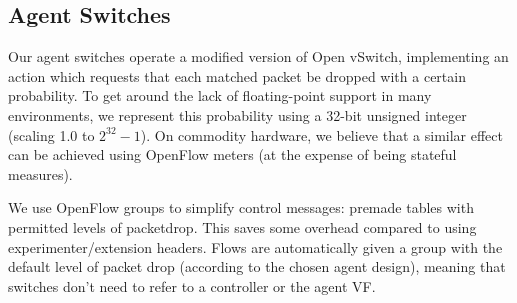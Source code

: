 \documentclass[10pt, times, conference, letterpaper]{IEEEtran}
\begin{document}
\subsection{Agent Switches}
Our agent switches operate a modified version of Open vSwitch, implementing an action which requests that each matched packet be dropped with a certain probability.
To get around the lack of floating-point support in many environments, we represent this probability using a 32-bit unsigned integer (scaling \num{1.0} to $2^{32}-1$).
On commodity hardware, we believe that a similar effect can be achieved using OpenFlow meters (at the expense of being stateful measures).

We use OpenFlow groups to simplify control messages: premade tables with permitted levels of packetdrop.
This saves some overhead compared to using experimenter/extension headers.
Flows are automatically given a group with the default level of packet drop (according to the chosen agent design), meaning that switches don't need to refer to a controller or the agent VF.

\end{document}
